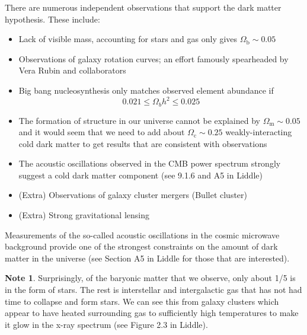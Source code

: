 \documentclass[a4paper,12pt]{article}
\theoremstyle{remark}
\newcommand{\mrm}[1]{\mathrm{#1}}
\renewcommand{\=}[1]{\stackrel{#1}{=}} %
\theoremstyle{plain}
\theoremstyle{definition}
\newtheorem*{definitionT}{Note}%
\newenvironment{note}{
\begin{dBox}
\begin{definitionT}}
{\end{definitionT}
\end{dBox}}
\begin{document}
There are numerous independent observations that support the dark matter hypothesis. These include:
\vspace{-5mm}
\begin{itemize}
\item Lack of visible mass, accounting for stars and gas only gives $\Omega _\mrm{b} \sim 0.05$
\item Observations of galaxy rotation curves; an effort famously spearheaded by Vera Rubin and collaborators
\item Big bang nucleosynthesis only matches observed element abundance if
\begin{equation}
0.021 \leq \Omega _b h^2 \leq 0.025
\end{equation}
\item The formation of structure in our universe cannot be explained by $\Omega _\mrm{m} \sim 0.05$ and it would seem that we need to add about $\Omega _\mrm{c} \sim 0.25$ weakly-interacting cold dark matter to get results that are consistent with observations
\item The acoustic oscillations observed in the CMB power spectrum strongly suggest a cold dark matter component (see 9.1.6 and A5 in Liddle)
\item (Extra) Observations of galaxy cluster mergers (Bullet cluster)
\item (Extra) Strong gravitational lensing
\end{itemize}
Measurements of the so-called acoustic oscillations in the cosmic microwave background provide one of the strongest constraints on the amount of dark matter in the universe (see Section A5 in Liddle for those that are interested).

\begin{note}
Surprisingly, of the baryonic matter that we observe, only about 1/5 is in the form of stars. The rest is interstellar and intergalactic gas that has not had time to collapse and form stars. We can see this from galaxy clusters which appear to have heated surrounding gas to sufficiently high temperatures to make it glow in the x-ray spectrum (see Figure 2.3 in Liddle).  
\end{note}
\end{document}

